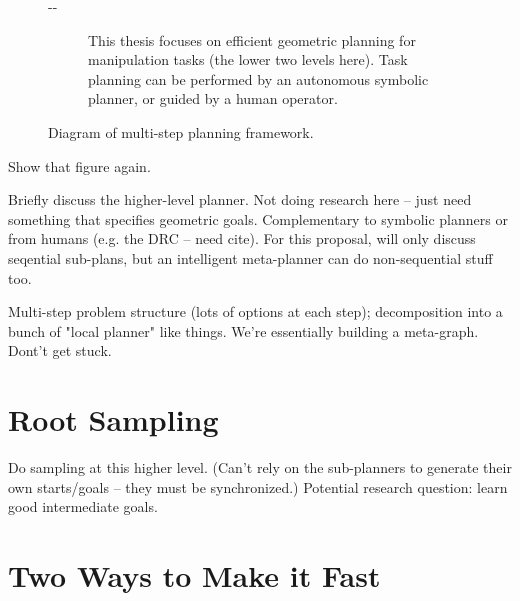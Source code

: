\documentclass{report}
\newlength{\offsetpage}
\newenvironment{widepage}
   {\begin{adjustwidth}{-\offsetpage}{-\offsetpage}%
    \addtolength{\textwidth}{2\offsetpage}}%
{\end{adjustwidth}}
\begin{document}
{\begin{figure}
\begin{widepage}
\begin{center}
\begin{subfigure}[t]{\linewidth}
\begin{center}
\end{center}
\caption{This thesis focuses on efficient geometric planning
   for manipulation tasks (the lower two levels here).
   Task planning can be performed by an autonomous
   symbolic planner,
   or guided by a human operator.}
\end{subfigure}

\end{center}
\caption{Diagram of multi-step planning framework.}
\end{widepage}
\end{figure}
}

Show that figure again.

Briefly discuss the higher-level planner.
Not doing research here -- just need something that specifies
geometric goals.
Complementary to symbolic planners
or from humans (e.g. the DRC -- need cite).
For this proposal,
will only discuss seqential sub-plans,
but an intelligent meta-planner
can do non-sequential stuff too.

Multi-step problem structure (lots of options at each step);
decomposition into a bunch of "local planner" like things.
We're essentially building a meta-graph.
Dont't get stuck.

\section{Root Sampling}

Do sampling at this higher level.
(Can't rely on the sub-planners to generate their own starts/goals --
they must be synchronized.)
Potential research question: learn good intermediate goals.

\section{Two Ways to Make it Fast}
\end{document}
